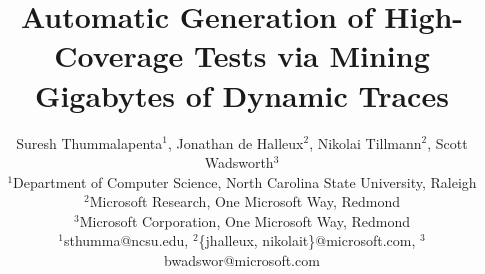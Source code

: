 \documentclass{sig-alternate}
\begin{document}
\title{Automatic Generation of High-Coverage Tests via Mining Gigabytes of Dynamic Traces}
%
%
%
%
%

%

\author{Suresh Thummalapenta$^1$, Jonathan de Halleux$^2$, Nikolai Tillmann$^2$, Scott Wadsworth$^3$\\
\small{$^1$Department of Computer Science, North Carolina State University, Raleigh}\\
\small{$^2$Microsoft Research, One Microsoft Way, Redmond}\\
\small{$^3$Microsoft Corporation, One Microsoft Way, Redmond}\\
\small{$^1$sthumma@ncsu.edu, $^2$\{jhalleux, nikolait\}@microsoft.com}, $^3$bwadswor@microsoft.com\\
}
\end{document}
